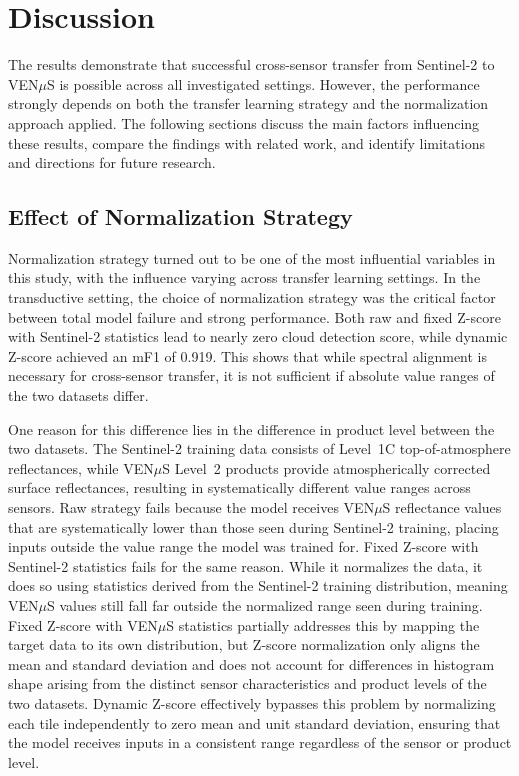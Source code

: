 \chapter{Discussion} \label{chap:discussion}

The results demonstrate that successful cross-sensor transfer from Sentinel-2 to VEN$\mu$S is possible across all investigated settings. However, the performance strongly depends on both the transfer learning strategy and the normalization approach applied. The following sections discuss the main factors influencing these results, compare the findings with related work, and identify limitations and directions for future research. 

\section{Effect of Normalization Strategy}
\label{sec:discussion_normalization}

Normalization strategy turned out to be one of the most influential variables in this study, with the influence varying across transfer learning settings. In the transductive setting, the choice of normalization strategy was the critical factor between total model failure and strong performance. Both raw and fixed Z-score with Sentinel-2 statistics lead to nearly zero cloud detection score, while dynamic Z-score achieved an mF1 of 0.919. This shows that while spectral alignment is necessary for cross-sensor transfer, it is not sufficient if absolute value ranges of the two datasets differ.

One reason for this difference lies in the difference in product level between the two datasets. The Sentinel-2 training data consists of Level~1C top-of-atmosphere reflectances, while VEN$\mu$S Level~2 products provide atmospherically corrected surface reflectances, resulting in systematically different value ranges across sensors. Raw strategy fails because the model receives VEN$\mu$S reflectance values that are systematically lower than those seen during Sentinel-2 training, placing inputs outside the value range the model was trained for. Fixed Z-score with Sentinel-2 statistics fails for the same reason. While it normalizes the data, it does so using statistics derived from the Sentinel-2 training distribution, meaning VEN$\mu$S values still fall far outside the normalized range seen during training. Fixed Z-score with VEN$\mu$S statistics partially addresses this by mapping the target data to its own distribution, but Z-score normalization only aligns the mean and standard deviation and does not account for differences in histogram shape arising from the distinct sensor characteristics and product levels of the two datasets. Dynamic Z-score effectively bypasses this problem by normalizing each tile independently to zero mean and unit standard deviation, ensuring that the model receives inputs in a consistent range regardless of the sensor or product level.

